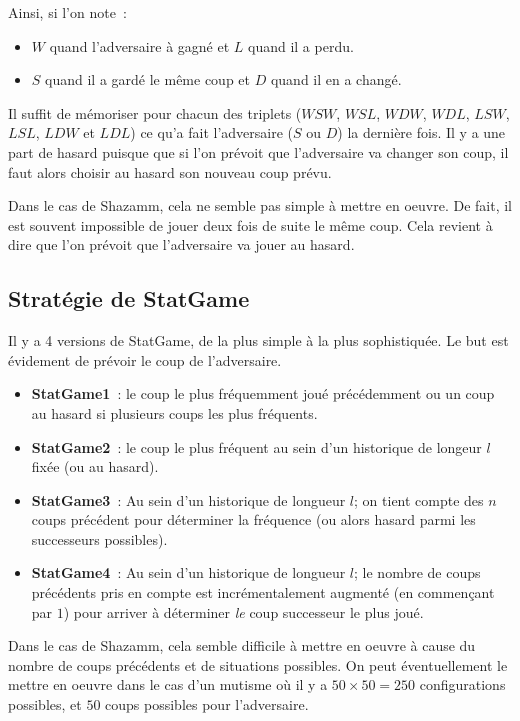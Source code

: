 Ainsi, si l'on note~:
\begin{itemize}
\item $W$ quand l'adversaire à gagné et $L$ quand il a perdu.
\item $S$ quand il a gardé le même coup et $D$ quand il en a changé.
\end{itemize}
Il suffit de mémoriser pour chacun des triplets ($WSW$, $WSL$, $WDW$, $WDL$, $LSW$, $LSL$, $LDW$ et $LDL$) ce qu'a fait l'adversaire ($S$ ou $D$) la dernière fois. Il y a une part de hasard puisque que si l'on prévoit que l'adversaire va changer son coup, il faut alors choisir au hasard son nouveau coup prévu.

Dans le cas de Shazamm, cela ne semble pas simple à mettre en oeuvre. De fait, il est souvent impossible de jouer deux fois de suite le même coup. Cela revient à dire que l'on prévoit que l'adversaire va jouer au hasard.

\subsection{Stratégie de StatGame}
\label{sec:statgame:statgame}

Il y a 4 versions de StatGame, de la plus simple à la plus sophistiquée. Le but est évidement de prévoir le coup de l'adversaire.
\begin{itemize}
\item{\bf StatGame1}~: le coup le plus fréquemment joué précédemment ou un coup au hasard si plusieurs coups les plus fréquents.
\item{\bf StatGame2}~: le coup le plus fréquent au sein d'un historique de longeur $l$ fixée (ou au hasard).
\item{\bf StatGame3}~: Au sein d'un historique de longueur $l$; on tient compte des $n$ coups précédent pour déterminer la fréquence (ou alors hasard parmi les successeurs possibles).
\item{\bf StatGame4}~: Au sein d'un historique de longueur $l$; le nombre de coups précédents pris en compte est incrémentalement augmenté (en commençant par $1$) pour arriver à déterminer {\em le} coup successeur le plus joué.
\end{itemize}

Dans le cas de Shazamm, cela semble difficile à mettre en oeuvre à cause du nombre de coups précédents et de situations possibles. On peut éventuellement le mettre en oeuvre dans le cas d'un mutisme où il y a $50 \times 50 = 250$ configurations possibles, et $50$ coups possibles pour l'adversaire.


